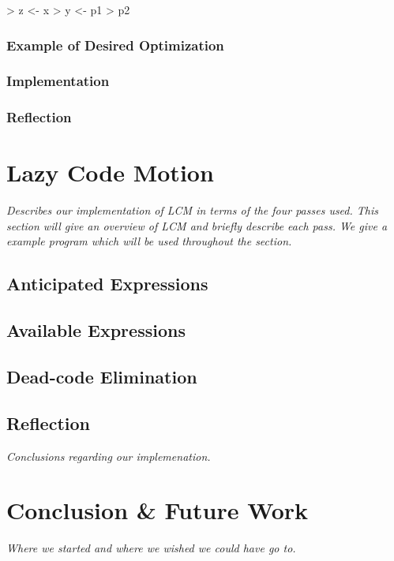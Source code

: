 \documentclass[12pt]{report}
\begin{document}
> z <- x
> y <- p1
> p2

\subsection{Example of Desired Optimization}
\subsection{Implementation}
\subsection{Reflection}

\chapter{Lazy Code Motion}
\emph{Describes our implementation of LCM in terms of the four passes
  used. This section will give an overview of LCM and briefly describe
  each pass. We give a example program which will be used throughout
  the section.}

\section{Anticipated Expressions}

\section{Available Expressions}

\section{Dead-code Elimination}

\section{Reflection}

\emph{Conclusions regarding our implemenation.}

\chapter{Conclusion \& Future Work}

\emph{Where we started and where we wished we could have go to.}


\end{document}

